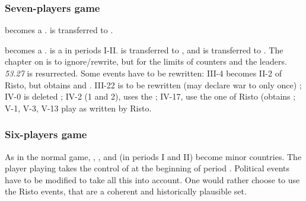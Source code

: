 \subsubsection{Seven-players game}
\aparag[Solution 1] \paysmajeurPologne becomes a \MIN. \paysmajeurSuede is
transferred to \paysmajeurPrusse.

\aparag[Solution 2] \paysmajeurSuede becomes a \MIN. \paysmajeurRussie is a
\MIN in periods I-II. \paysmajeurPortugal is transferred to \paysmajeurRussie,
and \paysmajeurPologne is transferred to \paysmajeurPrusse.
\bparag The chapter on \SUE is to ignore/rewrite, but for the limits of
counters and the leaders. \textit{53.27} is resurrected.
\bparag Some events have to be rewritten: III-4 becomes II-2 of Risto, but
\SUE obtains \provinceGotland and \provinceSkane. III-22 is to be rewritten
(\POL may declare war to \SUE only once) ; IV-0 is deleted ; IV-2 (1 and 2),
\SUE uses the \CB ; IV-17, use the one of Risto (\SUE obtains
\provinceVastergotland ; V-1, V-3, V-13 play as written by Risto.


\subsubsection{Six-players game}
\aparag As in the normal game, \paysmajeurPologne, \paysmajeurSuede,
\paysmajeurPrusse and \paysmajeurRussie (in periods I and II) become minor
countries.
\bparag The player playing \paysmajeurPortugal takes the control of
\paysmajeurRussie at the beginning of period .
\aparag Political events have to be modified to take all this into
account. One would rather choose to use the Risto events, that are a coherent
and historically plausible set.





